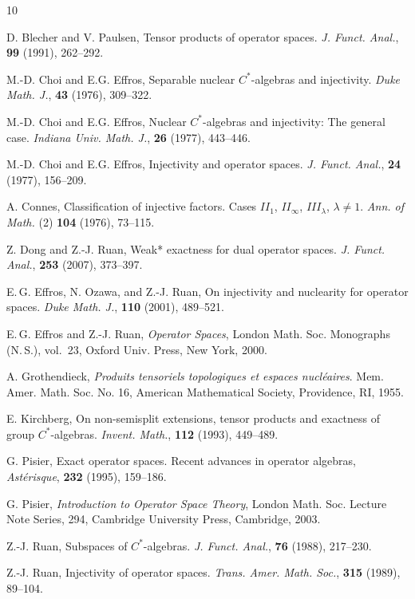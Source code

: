 \documentclass[12pt]{article}
\theoremstyle{definition}
\theoremstyle{remark}
\begin{document}
\begin{thebibliography}{10}

D. Blecher and V. Paulsen, Tensor products of operator spaces. \emph{J. Funct. Anal.}, \textbf{99} (1991), 262--292.

M.-D. Choi and E.G. Effros, Separable nuclear \(C^*\)-algebras and injectivity. \emph{Duke Math. J.}, \textbf{43} (1976), 309--322.

M.-D. Choi and E.G. Effros, Nuclear \(C^*\)-algebras and injectivity: The general case. \emph{Indiana Univ. Math. J.}, \textbf{26} (1977), 443--446.

M.-D. Choi and E.G. Effros, Injectivity and operator spaces. \emph{J. Funct. Anal.}, \textbf{24} (1977), 156--209.

A. Connes, Classification of injective factors. Cases $II_1$, $II_\infty$, $III_\lambda$, $\lambda \ne 1$. \emph{Ann. of Math.} (2) \textbf{104} (1976), 73--115.

Z. Dong and Z.-J. Ruan, Weak* exactness for dual operator spaces. \emph{J. Funct. Anal.}, \textbf{253} (2007), 373--397.

E.\,G. Effros, N. Ozawa, and Z.-J. Ruan, On injectivity and nuclearity for operator spaces. \emph{Duke Math. J.}, \textbf{110} (2001), 489--521.

E.\,G. Effros and Z.-J. Ruan, \emph{Operator Spaces}, London Math. Soc. Monographs (N.\,S.), vol.~23, Oxford Univ. Press, New York, 2000.

A. Grothendieck, \emph{Produits tensoriels topologiques et espaces nucl\'eaires}. Mem. Amer. Math. Soc. No. 16, American Mathematical Society, Providence, RI, 1955.

E. Kirchberg, On non-semisplit extensions, tensor products and exactness of group $C^*$-algebras. \emph{Invent. Math.}, \textbf{112} (1993), 449--489.

G. Pisier, Exact operator spaces. Recent advances in operator algebras, \emph{Ast\'erisque}, \textbf{232} (1995), 159--186.

G. Pisier, \emph{Introduction to Operator Space Theory}, London Math. Soc. Lecture Note Series, 294, Cambridge University Press, Cambridge, 2003.

Z.-J. Ruan, Subspaces of $C^*$-algebras. \emph{J. Funct. Anal.}, \textbf{76} (1988), 217--230.

Z.-J. Ruan, Injectivity of operator spaces. \emph{Trans. Amer. Math. Soc.}, \textbf{315} (1989), 89--104.

\end{thebibliography}
\end{document}
